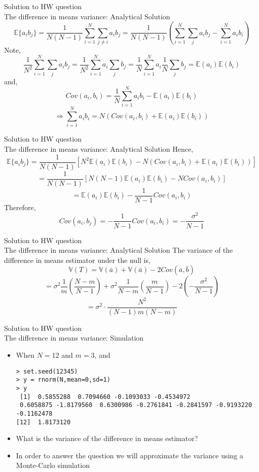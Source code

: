 \documentclass{beamer}
\theoremstyle{definition}
\begin{document}
\begin{frame}{Solution to HW question \\ 
The difference in means variance: Analytical Solution}
$$\mathbb{E}\lbrace a_i b_j \rbrace = 
\frac{1}{N(N-1)} \sum_{i=1}^N \sum_{j\neq i} a_i b_j= 
\frac{1}{N(N-1)} \left( \sum_{i=1}^N \sum_{j} a_i b_j  - 
\sum_{i=1}^N a_i b_i\right)$$
\pause
Note,
$$\frac{1}{N^2} \sum_{i=1}^N \sum_{j} a_i b_j = 
\frac{1}{N^2} \sum_{i=1}^N  a_i \sum_{j} b_j = 
\frac{1}{N} \sum_{i=1}^N  a_i \frac{1}{N} \sum_{j} b_j = 
\mathbb{E}(a_i)\mathbb{E}(b_i)$$
and, \pause
$$ Cov(a_i,b_i) = \frac{1}{N} \sum_{i=1}^N a_i b_i - \mathbb{E}(a_i)\mathbb{E}(b_i)$$
$$\Rightarrow \sum_{i=1}^N a_i b_i = N(Cov(a_i,b_i) +\mathbb{E}(a_i)\mathbb{E}(b_i))$$
 
\end{frame}


\begin{frame}{Solution to HW question \\ 
The difference in means variance: Analytical Solution}
Hence,
$$\mathbb{E}\lbrace a_i b_j \rbrace = 
\frac{1}{N(N-1)} \left[ N^2\mathbb{E}(a_i)\mathbb{E}(b_i)-  N(Cov(a_i,b_i) +\mathbb{E}(a_i)\mathbb{E}(b_i))\right]$$
\pause
$$= \frac{1}{N(N-1)} \left[ N(N-1)\mathbb{E}(a_i)\mathbb{E}(b_i)-  N Cov(a_i,b_i)\right]$$
$$= \mathbb{E}(a_i)\mathbb{E}(b_i)-  \frac{1}{N-1} Cov(a_i,b_i)$$
Therefore,
$$ Cov(a_i,b_j) = - \frac{1}{N-1} Cov(a_i,b_i) = - \frac{\sigma^2}{N-1}$$
\end{frame}

\begin{frame}{Solution to HW question \\ 
The difference in means variance: Analytical Solution}
The variance of the difference in means estimator under the null is,
$$\mathbb{V}(T) =  
\mathbb{V} \left( \bar{a} \right) + \mathbb{V} \left( \bar{a} \right) 
-2Cov(\bar{a},\bar{b})$$
$$ = \sigma^2 \frac{1}{m} \left( \frac{N - m}{N-1} \right) +
\sigma^2 \frac{1}{N-m} \left( \frac{m}{N-1} \right) 
-2 \left( - \frac{\sigma^2}{N-1} \right) $$
$$ = \sigma^2 \cdot  \frac{N^2}{(N-1)m(N-m)}  $$ 
\end{frame}


\begin{frame}[fragile]{Solution to HW question \\ 
The difference in means variance: Simulation}
\begin{itemize}
\item When $N=12$ and $m=3$, and 
\begin{verbatim}
> set.seed(12345)
> y = rnorm(N,mean=0,sd=1)
> y
 [1]  0.5855288  0.7094660 -0.1093033 -0.4534972  
 0.6058875 -1.8179560  0.6300986 -0.2761841 -0.2841597 -0.9193220 -0.1162478
[12]  1.8173120
\end{verbatim}
\item What is the variance of the difference in means estimator?
\item In order to answer the question we will approximate the variance using a Monte-Carlo simulation
\end{itemize}
\end{frame}
\end{document}

